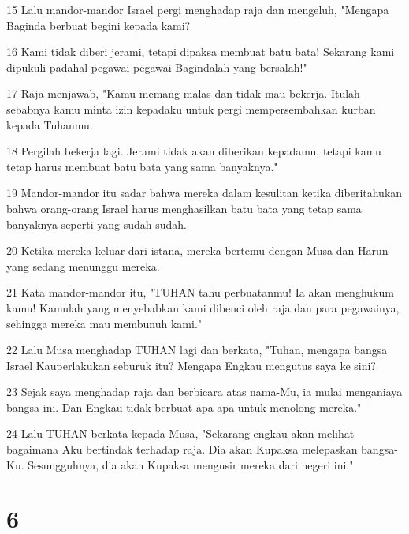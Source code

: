 \par 15 Lalu mandor-mandor Israel pergi menghadap raja dan mengeluh, "Mengapa Baginda berbuat begini kepada kami?
\par 16 Kami tidak diberi jerami, tetapi dipaksa membuat batu bata! Sekarang kami dipukuli padahal pegawai-pegawai Bagindalah yang bersalah!"
\par 17 Raja menjawab, "Kamu memang malas dan tidak mau bekerja. Itulah sebabnya kamu minta izin kepadaku untuk pergi mempersembahkan kurban kepada Tuhanmu.
\par 18 Pergilah bekerja lagi. Jerami tidak akan diberikan kepadamu, tetapi kamu tetap harus membuat batu bata yang sama banyaknya."
\par 19 Mandor-mandor itu sadar bahwa mereka dalam kesulitan ketika diberitahukan bahwa orang-orang Israel harus menghasilkan batu bata yang tetap sama banyaknya seperti yang sudah-sudah.
\par 20 Ketika mereka keluar dari istana, mereka bertemu dengan Musa dan Harun yang sedang menunggu mereka.
\par 21 Kata mandor-mandor itu, "TUHAN tahu perbuatanmu! Ia akan menghukum kamu! Kamulah yang menyebabkan kami dibenci oleh raja dan para pegawainya, sehingga mereka mau membunuh kami."
\par 22 Lalu Musa menghadap TUHAN lagi dan berkata, "Tuhan, mengapa bangsa Israel Kauperlakukan seburuk itu? Mengapa Engkau mengutus saya ke sini?
\par 23 Sejak saya menghadap raja dan berbicara atas nama-Mu, ia mulai menganiaya bangsa ini. Dan Engkau tidak berbuat apa-apa untuk menolong mereka."
\par 24 Lalu TUHAN berkata kepada Musa, "Sekarang engkau akan melihat bagaimana Aku bertindak terhadap raja. Dia akan Kupaksa melepaskan bangsa-Ku. Sesungguhnya, dia akan Kupaksa mengusir mereka dari negeri ini."

\chapter{6}

